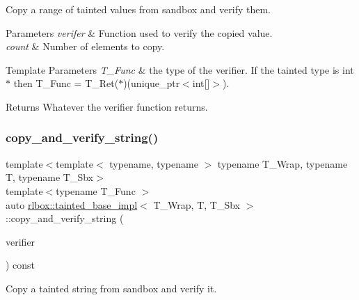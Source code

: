 Copy a range of tainted values from sandbox and verify them. 


\begin{DoxyParams}{Parameters}
{\em verifer} & Function used to verify the copied value. \\
\hline
{\em count} & Number of elements to copy. \\
\hline
\end{DoxyParams}

\begin{DoxyTemplParams}{Template Parameters}
{\em T\+\_\+\+Func} & the type of the verifier. If the tainted type is {\ttfamily int$\ast$} then {\ttfamily T\+\_\+\+Func = T\+\_\+\+Ret($\ast$)(unique\+\_\+ptr$<$int\mbox{[}\mbox{]}$>$)}. \\
\hline
\end{DoxyTemplParams}
\begin{DoxyReturn}{Returns}
Whatever the verifier function returns. 
\end{DoxyReturn}
\mbox{\label{classrlbox_1_1tainted__base__impl_aa377cc4d0ea6768ada5032234ac89aab}} 
\subsubsection{\texorpdfstring{copy\+\_\+and\+\_\+verify\+\_\+string()}{copy\_and\_verify\_string()}}
{\footnotesize\ttfamily template$<$template$<$ typename, typename $>$ typename T\+\_\+\+Wrap, typename T, typename T\+\_\+\+Sbx$>$ \\
template$<$typename T\+\_\+\+Func $>$ \\
auto \hyperlink{classrlbox_1_1tainted__base__impl}{rlbox\+::tainted\+\_\+base\+\_\+impl}$<$ T\+\_\+\+Wrap, T, T\+\_\+\+Sbx $>$\+::copy\+\_\+and\+\_\+verify\+\_\+string (\begin{DoxyParamCaption}\item[{T\+\_\+\+Func}]{verifier }\end{DoxyParamCaption}) const\hspace{0.3cm}{\ttfamily [inline]}}



Copy a tainted string from sandbox and verify it. 


